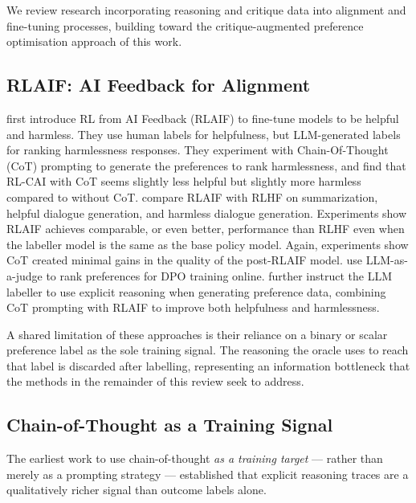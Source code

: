 We review research incorporating reasoning and critique data into alignment and fine-tuning processes, building toward the critique-augmented preference optimisation approach of this work.

\subsection{RLAIF: AI Feedback for Alignment}
\label{sec:rlaif}

\autocite{bai2022constitutionalaiharmlessnessai} first introduce RL from AI Feedback (RLAIF) to fine-tune models to be helpful and harmless. They use human labels for helpfulness, but LLM-generated labels for ranking harmlessness responses. They experiment with Chain-Of-Thought (CoT) prompting to generate the preferences to rank harmlessness, and find that RL-CAI with CoT seems slightly less helpful but slightly more harmless compared to without CoT. \autocite{lee2024rlaifvsrlhfscaling} compare RLAIF with RLHF on summarization, helpful dialogue generation, and harmless dialogue generation. Experiments show RLAIF achieves comparable, or even better, performance than RLHF even when the labeller model is the same as the base policy model. Again, experiments show CoT created minimal gains in the quality of the post-RLAIF model. \autocite{guo2024directlanguagemodelalignment} use LLM-as-a-judge to rank preferences for DPO training online. \autocite{li2024hrlaifimprovementshelpfulnessharmlessness} further instruct the LLM labeller to use explicit reasoning when generating preference data, combining CoT prompting with RLAIF to improve both helpfulness and harmlessness.

A shared limitation of these approaches is their reliance on a binary or scalar preference label as the sole training signal. The reasoning the oracle uses to reach that label is discarded after labelling, representing an information bottleneck that the methods in the remainder of this review seek to address.

\subsection{Chain-of-Thought as a Training Signal}
\label{sec:cot-signal}

The earliest work to use chain-of-thought \emph{as a training target} --- rather than merely as a prompting strategy --- established that explicit reasoning traces are a qualitatively richer signal than outcome labels alone.

